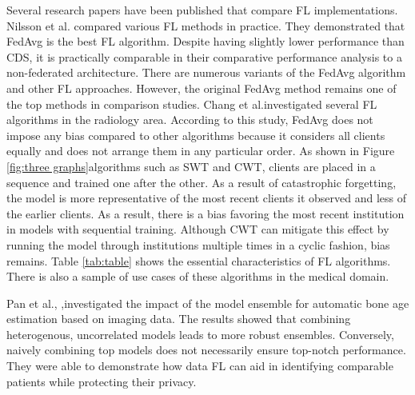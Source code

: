 Several research papers have been published that compare FL implementations. Nilsson et al. \cite{nilsson2018performance} compared various FL methods in practice. They demonstrated that FedAvg is the best FL algorithm. Despite having slightly lower performance than CDS, it is practically comparable in their comparative performance analysis to a non-federated architecture.
There are numerous variants of the FedAvg algorithm and other FL approaches. However, the original FedAvg method remains one of the top methods in comparison studies. Chang et al.\cite{chang2018distributed}investigated several FL algorithms in the radiology area. According to this study, FedAvg does not impose any bias compared to other algorithms because it considers all clients equally and does not arrange them in any particular order. As shown in Figure \ref{fig:three graphs}algorithms such as SWT and CWT, clients are placed in a sequence and trained one after the other. As a result of catastrophic forgetting, the model is more representative of the most recent clients it observed and less of the earlier clients\cite{sheller2020federated}. As a result, there is a bias favoring the most recent institution in models with sequential training. Although CWT can mitigate this effect by running the model through institutions multiple times in a cyclic fashion, bias remains. Table \ref{tab:table} shows the essential characteristics of FL algorithms. There is also a sample of use cases of these algorithms in the medical domain.




Pan et al., \cite{pan2019improving},investigated the impact of the model ensemble for automatic bone age estimation based on imaging data. The results showed that combining heterogenous, uncorrelated models leads to more robust ensembles. Conversely, naively combining top models does not necessarily ensure top-notch performance.
They were able to demonstrate how data FL can aid in identifying comparable patients while protecting their privacy. 





